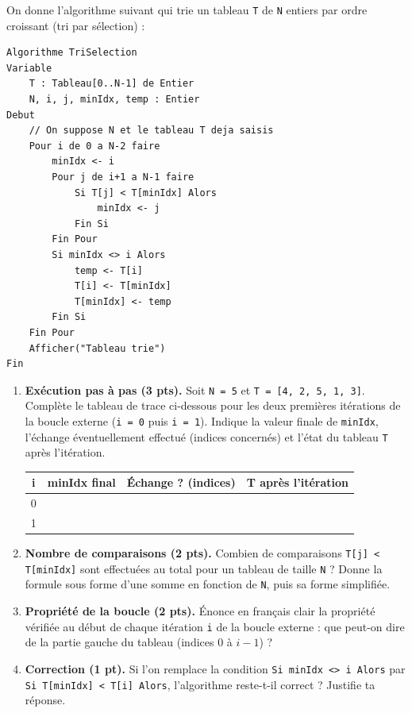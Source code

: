 \documentclass[11pt]{article}
\begin{document}
\begin{exercice}
On donne l'algorithme suivant qui trie un tableau \texttt{T} de \texttt{N} entiers par ordre croissant (tri par sélection) :

\begin{lstlisting}
Algorithme TriSelection
Variable
    T : Tableau[0..N-1] de Entier
    N, i, j, minIdx, temp : Entier
Debut
    // On suppose N et le tableau T deja saisis
    Pour i de 0 a N-2 faire
        minIdx <- i
        Pour j de i+1 a N-1 faire
            Si T[j] < T[minIdx] Alors
                minIdx <- j
            Fin Si
        Fin Pour
        Si minIdx <> i Alors
            temp <- T[i]
            T[i] <- T[minIdx]
            T[minIdx] <- temp
        Fin Si
    Fin Pour
    Afficher("Tableau trie")
Fin
\end{lstlisting}

\begin{enumerate}
    \item \textbf{Exécution pas à pas (3 pts).} Soit \texttt{N = 5} et \texttt{T = [4, 2, 5, 1, 3]}. Complète le tableau de trace ci-dessous pour les deux premières itérations de la boucle externe (\texttt{i = 0} puis \texttt{i = 1}). Indique la valeur finale de \texttt{minIdx}, l'échange éventuellement effectué (indices concernés) et l'état du tableau \texttt{T} après l'itération.

    \begin{center}
    \begin{tabularx}{\linewidth}{|c|c|X|X|}
    \hline
    \rowcolor{popblueL}\textbf{i} & \textbf{minIdx final} & \textbf{Échange ? (indices)} & \textbf{T après l'itération} \\
    \hline
    0 & & & \\
    \hline
    1 & & & \\
    \hline
    \end{tabularx}
    \end{center}

    \item \textbf{Nombre de comparaisons (2 pts).} Combien de comparaisons \texttt{T[j] < T[minIdx]} sont effectuées au total pour un tableau de taille \texttt{N} ? Donne la formule sous forme d'une somme en fonction de \texttt{N}, puis sa forme simplifiée.
    \item \textbf{Propriété de la boucle (2 pts).} Énonce en français clair la propriété vérifiée au début de chaque itération \texttt{i} de la boucle externe : que peut-on dire de la partie gauche du tableau (indices $0$ à $i-1$) ?
    \item \textbf{Correction (1 pt).} Si l'on remplace la condition \texttt{Si minIdx <> i Alors} par \texttt{Si T[minIdx] < T[i] Alors}, l'algorithme reste-t-il correct ? Justifie ta réponse.
\end{enumerate}
\end{exercice}
\end{document}
